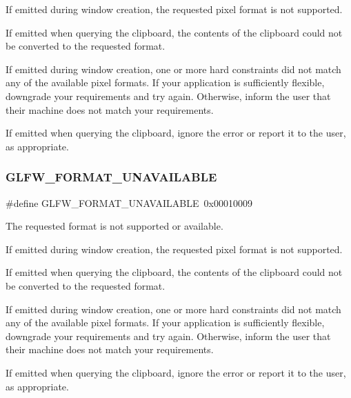 If emitted during window creation, the requested pixel format is not supported.

If emitted when querying the clipboard, the contents of the clipboard could not be converted to the requested format.

If emitted during window creation, one or more hard constraints did not match any of the available pixel formats. If your application is sufficiently flexible, downgrade your requirements and try again. Otherwise, inform the user that their machine does not match your requirements.

\begin{DoxyParagraph}{}
If emitted when querying the clipboard, ignore the error or report it to the user, as appropriate. 
\end{DoxyParagraph}
\mbox{\label{group__errors_ga196e125ef261d94184e2b55c05762f14}} 
\subsubsection{\texorpdfstring{G\+L\+F\+W\+\_\+\+F\+O\+R\+M\+A\+T\+\_\+\+U\+N\+A\+V\+A\+I\+L\+A\+B\+LE}{GLFW\_FORMAT\_UNAVAILABLE}\hspace{0.1cm}{\footnotesize\ttfamily [5/5]}}
{\footnotesize\ttfamily \#define G\+L\+F\+W\+\_\+\+F\+O\+R\+M\+A\+T\+\_\+\+U\+N\+A\+V\+A\+I\+L\+A\+B\+LE~0x00010009}



The requested format is not supported or available. 

If emitted during window creation, the requested pixel format is not supported.

If emitted when querying the clipboard, the contents of the clipboard could not be converted to the requested format.

If emitted during window creation, one or more hard constraints did not match any of the available pixel formats. If your application is sufficiently flexible, downgrade your requirements and try again. Otherwise, inform the user that their machine does not match your requirements.

\begin{DoxyParagraph}{}
If emitted when querying the clipboard, ignore the error or report it to the user, as appropriate. 
\end{DoxyParagraph}
\mbox{\label{group__errors_ga76f6bb9c4eea73db675f096b404593ce}} 
